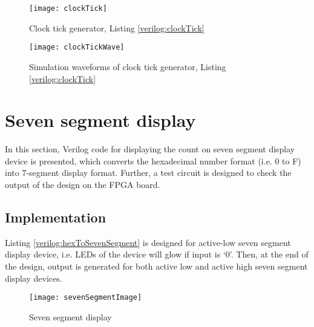 

\begin{figure}[!h]
	\centering
	\texttt{[image: clockTick]}
	\caption{Clock tick generator, Listing \ref{verilog:clockTick}}
	\label{fig:clockTick}
\end{figure}

\begin{figure}[!h]
	\centering
	\texttt{[image: clockTickWave]}
	\caption{Simulation waveforms of clock tick generator, Listing \ref{verilog:clockTick}}
	\label{fig:clockTickWave}
\end{figure}

\section{Seven segment display} \label{sec:sevenSegmentDisplay}
In this section, Verilog code for displaying the count on seven segment display device is presented, which converts the hexadecimal number format (i.e. 0 to F) into 7-segment display format. Further, a test circuit is designed to check the output of the design on the FPGA board. 

\subsection{Implementation}

Listing \ref{verilog:hexToSevenSegment} is designed for active-low seven segment display device, i.e. LEDs of the device will glow if input is `0'. Then, at the end of the design, output is generated for both active low and active high seven segment display devices. 

\begin{figure}[!h]
	\centering
	\texttt{[image: sevenSegmentImage]}
	\caption{Seven segment display}
	\label{fig:sevenSegmentImage}
\end{figure}


